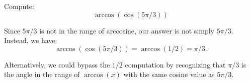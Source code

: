\documentclass{ximera}
\begin{document}
\begin{example}
  Compute:
  \[
  \arccos(\cos(5\pi/3))
  \]
  \begin{explanation}
    Since $5\pi/3$ is not in the range of
    arccosine, our answer is not simply $5\pi/3$. Instead, we have:
    \[  \arccos(\cos(5\pi/3))=\arccos(1/2)=\pi/3.\]
    
Alternatively, we could bypass the $1/2$ computation by recognizing that $\pi/3$ is the angle in the range of $\arccos(x)$ with the same cosine value as $5\pi/3$.
    
%
%          

\end{explanation}
\end{example}
\end{document}
